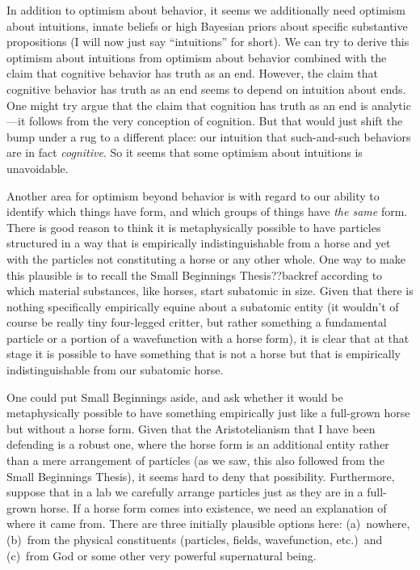 In addition to optimism about behavior, it seems we additionally need optimism about intuitions, innate beliefs or 
high Bayesian priors about specific substantive propositions (I will now just say ``intuitions'' for short). We can try to derive 
this optimism about intuitions from optimism about behavior combined with the claim that cognitive behavior has truth as 
an end. However, the claim that cognitive behavior has truth as an end seems to depend on intuition about ends. One might 
try argue that the claim that cognition has truth as an end is analytic---it follows from the very conception of cognition.
But that would just shift the bump under a rug to a different place: our intuition that such-and-such behaviors are in fact
\textit{cognitive}. So it seems that some optimism about intuitions is unavoidable. 

Another area for optimism beyond behavior is with regard to our ability to identify which things have form, and which groups of
things have \textit{the same} form. There is good reason to think it is metaphysically possible to have particles structured in 
a way that is empirically indistinguishable from a horse and yet with the particles not constituting a horse or any other 
whole. One way to make this plausible is to recall the Small Beginnings Thesis??backref according to which material substances, 
like horses, start subatomic in size. Given that there is nothing specifically empirically equine about a subatomic entity
(it wouldn't of course be really tiny four-legged critter, but rather something a fundamental particle or a portion of a 
wavefunction with a horse form), it is clear that at that stage it is possible to have something that is not a horse but 
that is empirically indistinguishable from our subatomic horse. 

One could put Small Beginnings aside, and ask whether it would be metaphysically possible to have something empirically
just like a full-grown horse but without a horse form. Given that the Aristotelianism that I have been defending is a 
robust one, where the horse form is an additional entity rather than a mere arrangement of particles (as we saw, this also
followed from the Small Beginnings Thesis), it seems hard to deny that possibility. Furthermore, suppose that in a lab we 
carefully arrange particles just as they are in a full-grown horse. If a horse form comes into existence, we need an explanation 
of where it came from. There are three initially plausible options here: (a)~nowhere, (b)~from the physical constituents (particles,
fields, wavefunction, etc.)\ and (c)~from God or some other very powerful supernatural being.

